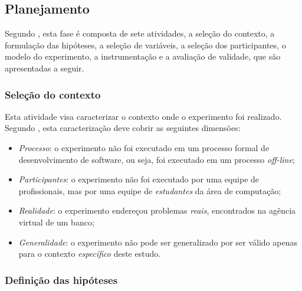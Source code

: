 \subsection{Planejamento}
\label{planning}

Segundo  , esta fase  é composta  de sete
atividades,  a seleção  do  contexto, a  formulação  das hipóteses,  a
seleção  de  variáveis,  a  seleção  dos participantes,  o  modelo  do
experimento,  a instrumentação  e  a avaliação  de  validade, que  são
apresentadas a seguir.

\subsubsection{Seleção do contexto}
\label{contextSelection}

Esta  atividade visa caracterizar  o contexto  onde o  experimento foi
realizado. Segundo  , esta caracterização
deve cobrir as seguintes dimensões:

\begin{itemize}

  \item {\em Processo}: o experimento não foi executado em um processo
    formal de  desenvolvimento de software, ou seja,  foi executado em
    um processo {\em off-line};

  \item {\em  Participantes}: o experimento não foi  executado por uma
    equipe de profissionais, mas por uma equipe de {\em estudantes} da
    área de computação;

  \item  {\em  Realidade}:  o  experimento  endereçou  problemas  {\em
    reais}, encontrados na agência virtual de um banco;

  \item {\em  Generalidade}: o  experimento não pode  ser generalizado
    por  ser válido  apenas  para o  contexto  {\em específico}  deste
    estudo.

\end{itemize}

\subsubsection{Definição das hipóteses}
\label{hypothesisFormulation}

